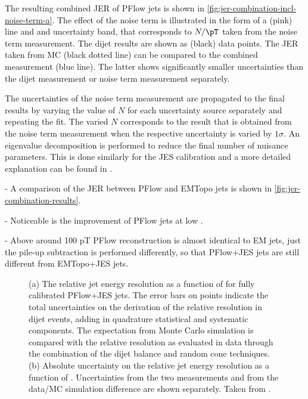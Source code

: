 The resulting combined JER of PFlow jets is shown in \cref{fig:jer-combination-incl-noise-term-a}. The effect of the noise term is illustrated in the form of a (pink) line and and uncertainty band, that corresponds to $N / \pT$ taken from the noise term measurement. The dijet results are shown as (black) data points.
The JER taken from MC (black dotted line) can be compared to the combined \insitu measurement (blue line). The latter shows significantly smaller uncertainties than the dijet measurement or noise term measurement separately. 

The uncertainties of the noise term measurement are propagated to the final results by varying the value of $N$ for each uncertainty source separately and repeating the fit. The varied $N$ corresponds to the result that is obtained from the noise term measurement when the respective uncertainty is varied by $1\sigma$.
An eigenvalue decomposition is performed to reduce the final number of nuisance parameters. This is done similarly for the JES calibration and a more detailed explanation can be found in .

- A comparison of the JER between PFlow and EMTopo jets is shown in \cref{fig:jer-combination-results}.

- Noticeable is the improvement of PFlow jets at low \pT.

- Above around 100 pT PFlow reconstruction is almost identical to EM jets, just the pile-up subtraction is performed differently, so that PFlow+JES jets are still different from EMTopo+JES jets.



\FloatBarrier
\begin{figure}
    \caption{(a) The relative jet energy resolution as a function of \pT for fully calibrated PFlow+JES jets. The error bars on points indicate the total uncertainties on the derivation of the relative resolution in dijet events, adding in quadrature statistical and systematic components. The expectation from Monte Carlo simulation is compared with the relative resolution as evaluated in data through the combination of the dijet balance and random cone techniques. (b) Absolute uncertainty on the relative jet energy resolution as a function of \pTjet. Uncertainties from the two \insitu measurements and from the data/MC simulation difference are shown separately. Taken from .}
    \label{fig:jer-combination-incl-noise-term}
\end{figure}



